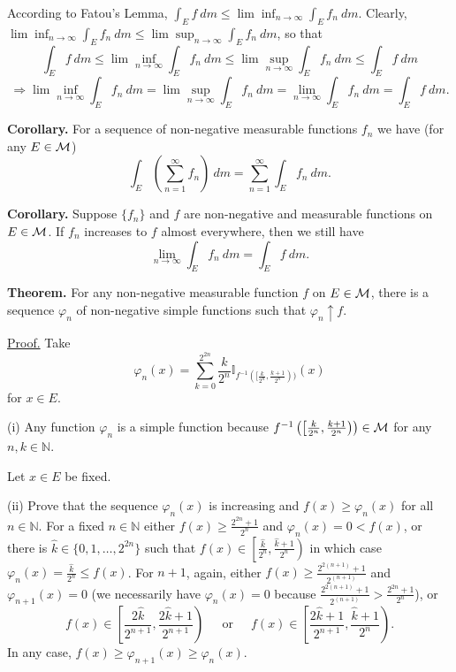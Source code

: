 \documentclass[a4paper,10pt]{article}
\def\NN{\mathbb{N}}
\def\II{\mathbb{I}}
\newcommand{\1}[1]{\mathbf{1}_{\{#1\}}}
\begin{document}
According to Fatou's Lemma, $\int_E f~dm\le\lim \inf_{n\to\infty}\int_E f_n~dm$. Clearly, $\lim \inf_{n\to\infty} \int_E f_n~dm\le \lim \sup_{n\to\infty} \int_E f_n~dm$, so that
  $$\int_E f~dm\le \lim \inf_{n\to\infty} \int_E f_n~dm\le \lim \sup_{n\to\infty} \int_E f_n~dm\le \int_E f~dm$$
  $$\Longrightarrow \lim \inf_{n\to\infty}\int_E f_n~dm=\lim \sup_{n\to\infty} \int_E f_n~dm=\lim_{n\to\infty} \int_E f_n~dm=\int_E f~dm.$$
\blacksquare \vspace{3mm}

{\bf Corollary.} For a sequence of non-negative measurable functions $f_n$ we have (for any $E\in{\cal M}$)
  $$\int_E\left(\sum_{n=1}^\infty f_n\right)~dm =\sum_{n=1}^\infty \int_E f_n~dm.$$
\vspace{3mm}

{\bf Corollary.} Suppose $\{f_n\}$ and $f$ are non-negative and measurable functions on $E\in{\cal M}$. If $f_n$ increases to $f$ almost everywhere, then we still have
  $$\lim_{n\to\infty} \int_E f_n~ dm=\int_E f~dm.$$
\vspace{3mm}

{\bf Theorem.} For any non-negative measurable function $f$ on $E\in{\cal M}$, there is a sequence $\varphi_n$ of non-negative simple functions such that $\varphi_n\uparrow f$.\vspace{3mm}

\underline{Proof.} Take
  $$\varphi_n(x)=\sum_{k=0}^{2^{2n}} \frac{k}{2^n} \II_{f^{-1}([\frac{k}{2^n},\frac{k+1}{2^n}))}(x)$$
  for $x\in E$. \vspace{2cm}

(i) Any function $\varphi_n$ is a simple function because $f^{-1}\left(\left[\frac{k}{2^n},\frac{k+1}{2^n}\right)\right)\in{\cal M}$ for any $n,k\in\NN$.

Let $x\in E$ be fixed.

(ii) Prove that the sequence $\varphi_n(x)$ is increasing and $f(x)\ge\varphi_n(x)$ for all $n\in\NN$. For a fixed $n\in\NN$ either $f(x)\ge \frac{2^{2n}+1}{2^n}$ and $\varphi_n(x)=0<f(x)$, or there is $\hat k\in\{0,1,\ldots, 2^{2n}\}$ such that $f(x)\in\left[\frac{\hat k}{2^n},\frac{\hat k+1}{2^n}\right)$ in which case $\varphi_n(x)=\frac{\hat k}{2^n}\le f(x)$. For $n+1$, again, either $f(x)\ge \frac{2^{2(n+1)}+1}{2^{(n+1)}}$ and $\varphi_{n+1}(x)=0$ (we necessarily have $\varphi_n(x)=0$ because $\frac{2^{2(n+1)}+1}{2^{(n+1)}}>\frac{2^{2n}+1}{2^n}$), or
  $$f(x)\in\left[\frac{2\hat k}{2^{n+1}},\frac{2\hat k+1}{2^{n+1}}\right)~~~~~\mbox{ or }~~~~~
f(x)\in\left[\frac{2\hat k+1}{2^{n+1}},\frac{\hat k+1}{2^n}\right).$$
In any case, $f(x)\ge\varphi_{n+1}(x)\ge \varphi_n(x)$.
\end{document}
